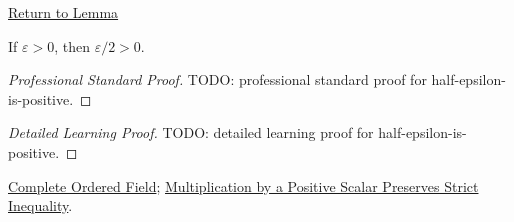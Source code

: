 \newpage
{}
\label{prf:half-epsilon-is-positive}

\begin{remark*}[Return]
\hyperref[lem:half-epsilon-is-positive]{Return to Lemma}
\end{remark*}

\begin{lemma*}
If $\varepsilon>0$, then $\varepsilon/2>0$.
\end{lemma*}

\begin{proof}[Professional Standard Proof]
\LRAProofBodyStart
TODO: professional standard proof for half-epsilon-is-positive.
\end{proof}

\begin{proof}[Detailed Learning Proof]
\LRAProofBodyStart
TODO: detailed learning proof for half-epsilon-is-positive.
\end{proof}

\begin{remark*}
\end{remark*}

\begin{dependencies}
\hyperref[def:real-ordered-field]{Complete Ordered Field};
\hyperref[thm:ineq-multiply-positive]{Multiplication by a Positive Scalar Preserves Strict Inequality}.
\end{dependencies}

\clearpage
